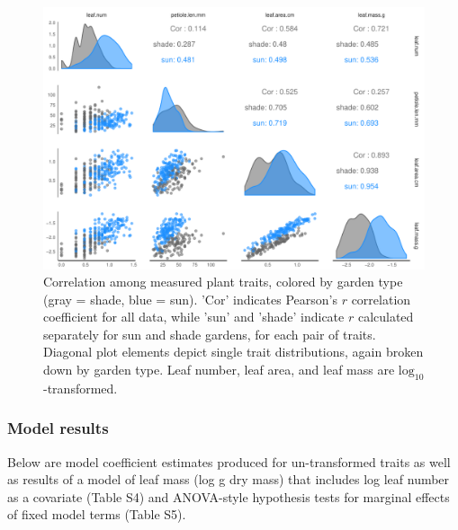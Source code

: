 \documentclass[11pt, oneside]{amsart}
\begin{document}
\begin{figure}[!hptb]
\centering
\includegraphics[scale=0.66]{traitcors}
\caption{Correlation among measured plant traits, colored by garden type (gray = shade, blue = sun). 'Cor' indicates Pearson's $r$ correlation coefficient for all data, while 'sun' and 'shade' indicate $r$ calculated separately for sun and shade gardens, for each pair of traits. Diagonal plot elements depict single trait distributions, again broken down by garden type. Leaf number, leaf area, and leaf mass are $\text{log}_{10}$-transformed.}
\label{FigS5}
\end{figure}

\clearpage

\subsubsection{Model results}

Below are model coefficient estimates produced for un-transformed traits as well as results of a model of leaf mass (log g dry mass) that includes log leaf number as a covariate (Table S4) and ANOVA-style hypothesis tests for marginal effects of fixed model terms (Table S5).

\vspace{1cm}
\end{document}
